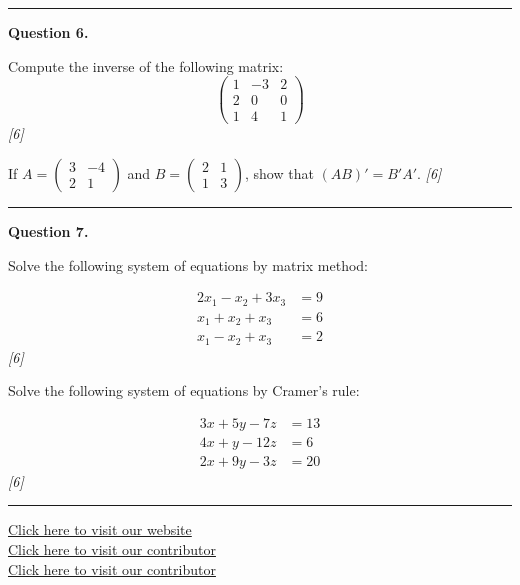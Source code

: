 \documentclass[11pt,a4paper]{article}
\newcommand{\pts}[1]{\hfill   \textit{[#1]}}
\begin{document}
\medskip\rule{\linewidth}{0.2pt}

\medskip


\noindent   \textbf{Question 6.}

\begin{parts}
  \item Compute the inverse of the following matrix:
  \[
  
\begin{pmatrix}
  1 & -3 & 2 \\
  2 & 0 & 0 \\
  1 & 4 & 1
  \end{pmatrix}
  \] \pts{6}
  \item If $A = 
\begin{pmatrix} 3 & -4 \\ 2 & 1 \end{pmatrix}$ and $B = 
\begin{pmatrix} 2 & 1 \\ 1 & 3 \end{pmatrix}$, show that $(AB)' = B' A'$. \pts{6}
\end{parts}

\medskip\rule{\linewidth}{0.2pt}

\medskip


\noindent   \textbf{Question 7.}

\begin{parts}
  \item Solve the following system of equations by matrix method:
  
\begin{align*}
  2x_1 - x_2 + 3x_3 &= 9 \\
  x_1 + x_2 + x_3 &= 6 \\
  x_1 - x_2 + x_3 &= 2
  \end{align*} \pts{6}
  \item Solve the following system of equations by Cramer's rule:
  
\begin{align*}
  3x + 5y - 7z &= 13 \\
  4x + y - 12z &= 6 \\
  2x + 9y - 3z &= 20
  \end{align*} \pts{6}
\end{parts}

\vfill
\rule{\linewidth}{0.4pt}

\begin{center}\small
  \href{https://bhu-exam.vercel.app/}{Click here to visit our website}\\[4pt]
  \href{https://me-aryan.vercel.app/}{Click here to visit our contributor}\\[4pt]
  \href{https://quashan-me.vercel.app/}{Click here to visit our contributor}
\end{center}
\end{document}
